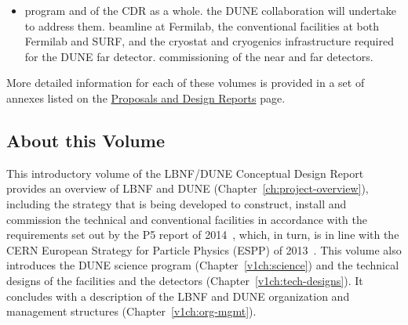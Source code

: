 \begin{itemize}

\item program and of the CDR as a whole.
the DUNE collaboration will undertake to address them.
beamline at Fermilab, the conventional facilities at both Fermilab and SURF, and the cryostat
 and cryogenics infrastructure required for the DUNE far detector.
commissioning of the near and far detectors. 
\end{itemize}

More detailed information for each of these volumes is provided in a set of annexes listed on the \href{https://web.fnal.gov/project/LBNF/SitePages/Proposals%20and%20Design%20Reports.aspx}{Proposals and Design Reports} 
page. 


\subsection{About this Volume}

This introductory volume of the LBNF/DUNE Conceptual Design Report provides an overview of LBNF and
DUNE (Chapter~\ref{ch:project-overview}), including the strategy that is being developed to construct, install and commission the technical and conventional facilities in accordance with the requirements set out by the P5 report of 2014~\cite{p5report2014}, which, in turn, is in line with the CERN
European Strategy for Particle Physics (ESPP) of 2013~\cite{ESPP-2012}. This volume also introduces the DUNE science program (Chapter~\ref{v1ch:science}) and the technical designs of the facilities and the detectors 
(Chapter~\ref{v1ch:tech-designs}). It concludes with a description of the LBNF and DUNE organization and management structures (Chapter~\ref{v1ch:org-mgmt}).



